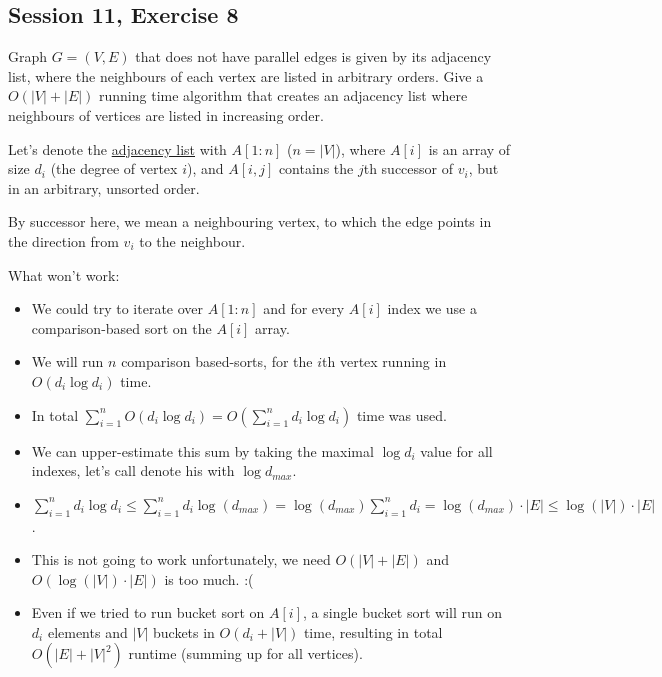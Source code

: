 \subsection {Session 11, Exercise 8}


Graph $G = (V,E)$ that does not have parallel edges is given by its adjacency list, where the neighbours of each vertex are listed in arbitrary orders. Give a $O(|V | + |E|)$ running time algorithm that creates an adjacency list where neighbours of vertices are listed in increasing order.


Let's denote the \href{https://en.wikipedia.org/wiki/Adjacency_list}{adjacency list} with $A[1:n]$ ($n=|V|$), where $A[i]$ is an array of size $d_i$ (the degree of vertex $i$), and $A[i,j]$ contains the $j$th successor of $v_i$, but in an arbitrary, unsorted order.

By successor here, we mean a neighbouring vertex, to which the edge points in the direction from $v_i$ to the neighbour.

What won't work:
\begin{itemize}
    \item We could try to iterate over $A[1:n]$ and for every $A[i]$ index we use a comparison-based sort on the $A[i]$ array.
    \item We will run $n$ comparison based-sorts, for the $i$th vertex running in $O(d_i\log{}d_i)$ time.
    \item In total $\sum\limits_{i=1}^n O(d_i\log{}d_i) = O(\sum\limits_{i=1}^n d_i\log{}d_i)$ time was used.
    \item We can upper-estimate this sum by taking the maximal $\log{}d_i$ value for all indexes, let's call denote his with $\log{}d_{max}$.
    \item $\sum\limits_{i=1}^n d_i\log{}d_i \leq{} \sum\limits_{i=1}^n d_i\log{}(d_{max}) = \log{}(d_{max})\sum\limits_{i=1}^n d_i = \log{}(d_{max})\cdot{}|E| \leq{} \log{}(|V|)\cdot{}|E|$.
    \item This is not going to work unfortunately, we need $O(|V| + |E|)$ and $O(\log{}(|V|)\cdot{}|E|)$ is too much. :(
    \item Even if we tried to run bucket sort on $A[i]$, a single bucket sort will run on $d_i$ elements and $|V|$ buckets in $O(d_i + |V|)$ time, resulting in total $O(|E| + |V|^2)$ runtime (summing up for all vertices).
\end{itemize}

